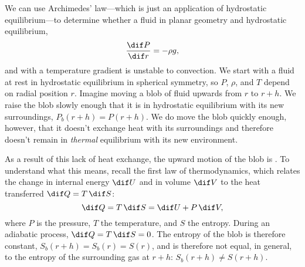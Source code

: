 We can use Archimedes' law---which is just an application of hydrostatic equilibrium---to determine whether a fluid in planar geometry and hydrostatic equilibrium,
\begin{equation}
\frac{\dif P}{\dif r} = -\rho g,
\end{equation}
and with a temperature gradient is unstable to convection. We start with a fluid at rest in hydrostatic equilibrium in spherical symmetry, so $P$, $\rho$, and $T$ depend on radial position $r$.
Imagine moving a blob of fluid upwards from $r$ to $r+h$. We raise the blob slowly enough that it is in hydrostatic equilibrium with its new surroundings, $P_{b}(r+h) = P(r+h)$. We do move the blob quickly enough, however, that it doesn't exchange heat with its surroundings and therefore doesn't remain in \emph{thermal} equilibrium with its new environment. 

As a result of this lack of heat exchange, the upward motion of the blob is .  
To understand what this means, recall the first law of thermodynamics, which relates the change in internal energy $\dif U$ and in volume $\dif V$ to the heat transferred $\dif Q = T\,\dif S$:
\begin{equation}\label{e.first-law-thermo}
	\dif Q = T\,\dif S = \dif U + P\,\dif V,
\end{equation}
where $P$ is the pressure, $T$ the temperature, and $S$ the entropy. During an adiabatic process, $\dif Q = T\,\dif S = 0$. The entropy of the blob is therefore constant, 
$S_{b}(r+h) = S_{b}(r) = S(r)$, and is therefore not equal, in general, to the entropy of the surrounding gas at $r+h$: $S_{b}(r+h)  \neq S(r+h)$.

